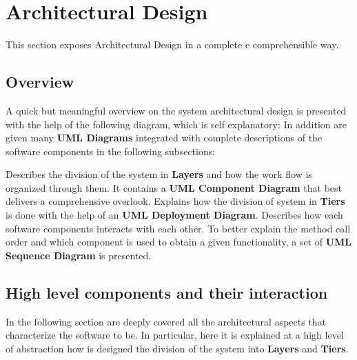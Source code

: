 \section{Architectural Design}
This section exposes \myTaxiService{} Architectural Design in a complete e comprehensible way.
%
\subsection{Overview}
A quick but meaningful overview on the system architectural design is presented with the help of the following diagram, which is self explanatory:
In addition are given many \textbf{UML Diagrams} integrated with complete descriptions of the software components in the following subsections:
\begin{itemize}
	 Describes the division of the system in \textbf{Layers} and how the work flow is organized through them.
		It contains a \textbf{UML Component Diagram} that best delivers a comprehensive overlook.
	 Explains how the division of system in \textbf{Tiers} is done with the help of an \textbf{UML Deployment Diagram}.
	 Describes how each software components interacts with each other.
		To better explain the method call order and which component is used to obtain a given functionality, a set of \textbf{UML Sequence Diagram} is presented.
\end{itemize}
%
\subsection{High level components and their interaction}
In the following section are deeply covered all the architectural aspects that characterize the software to be.
In particular, here it is explained at a high level of abstraction how is designed the division of the system into \textbf{Layers} and \textbf{Tiers}.
%
